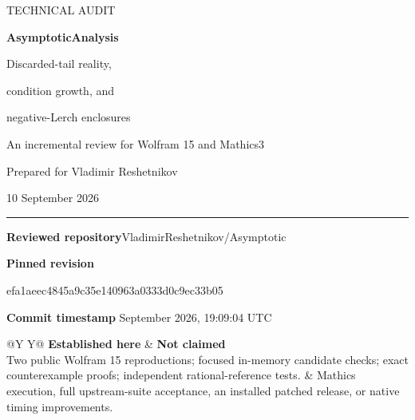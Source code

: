 \documentclass[11pt,a4paper]{article}
\begin{document}
\begin{titlepage}
\thispagestyle{empty}
{\sffamily\color{accent}\large TECHNICAL AUDIT\par}
\vspace{18mm}
{\sffamily\bfseries\color{ink}\fontsize{30}{35}\selectfont AsymptoticAnalysis\par}
\vspace{6mm}
{\sffamily\fontsize{21}{27}\selectfont Discarded-tail reality,\par condition growth, and\par negative-Lerch enclosures\par}
\vspace{12mm}
{\large An incremental review for Wolfram 15 and Mathics3\par}
\vspace{8mm}
{Prepared for Vladimir Reshetnikov\par 10 September 2026\par}
\vfill
\rule{\textwidth}{0.6pt}
\vspace{4mm}
\textbf{Reviewed repository}\quad VladimirReshetnikov/Asymptotic\par
\textbf{Pinned revision}\par
{\small\ttfamily efa1aeec4845a9c35e140963a0333d0c9ec33b05\par}
\textbf{Commit timestamp} September 2026, 19:09:04 UTC\par
\vspace{5mm}
\begin{tabularx}{\textwidth}{@{}Y Y@{}}
\textbf{Established here} & \textbf{Not claimed}\\[3pt]
Two public Wolfram 15 reproductions; focused in-memory candidate checks; exact counterexample proofs; independent rational-reference tests.
& Mathics execution, full upstream-suite acceptance, an installed patched release, or native timing improvements.\\
\end{tabularx}
\end{titlepage}
\end{document}
